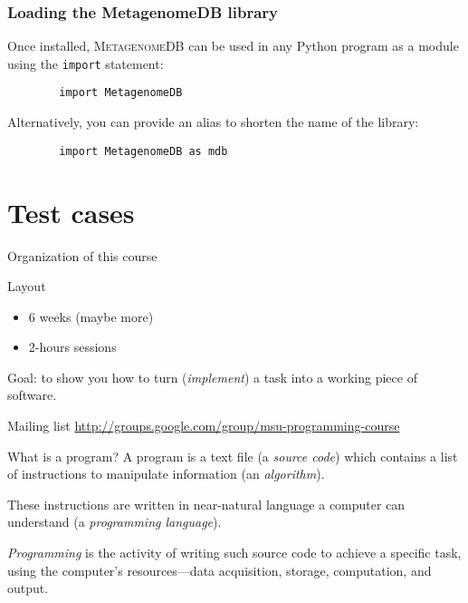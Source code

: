 \documentclass[handout]{beamer}
\begin{document}
\begin{frame}[fragile]
	\frametitle{Loading the MetagenomeDB library}
	Once installed, \textsc{MetagenomeDB} can be used in any Python program as a module using the \texttt{import} statement:

	\begin{verbatim}
		import MetagenomeDB
	\end{verbatim}

	Alternatively, you can provide an alias to shorten the name of the library:

	\begin{verbatim}
		import MetagenomeDB as mdb
	\end{verbatim}
\end{frame}

\section{Test cases}

\begin{frame}{Organization of this course}
	\begin{block}{Layout}
		\begin{itemize}
			\item 6 weeks (maybe more)
			\item 2-hours sessions
		\end{itemize}
	\end{block}

	\pause
	\bigskip
	Goal: to show you how to turn (\textit{implement}) a task into a working piece of software.

	\pause
	\bigskip
	\begin{block}{Mailing list}
		\url{http://groups.google.com/group/msu-programming-course}
	\end{block}
\end{frame}

\begin{frame}{What is a program?}
	A program is a text file (a \textit{source code}) which contains a list of instructions to manipulate information (an \textit{algorithm}).

	\pause
	\bigskip
	These instructions are written in near-natural language a computer can understand (a \textit{programming language}).

	\pause
	\bigskip
	\textit{Programming} is the activity of writing such source code to achieve a specific task, using the computer's resources---data acquisition, storage, computation, and output.
\end{frame}
\end{document}

